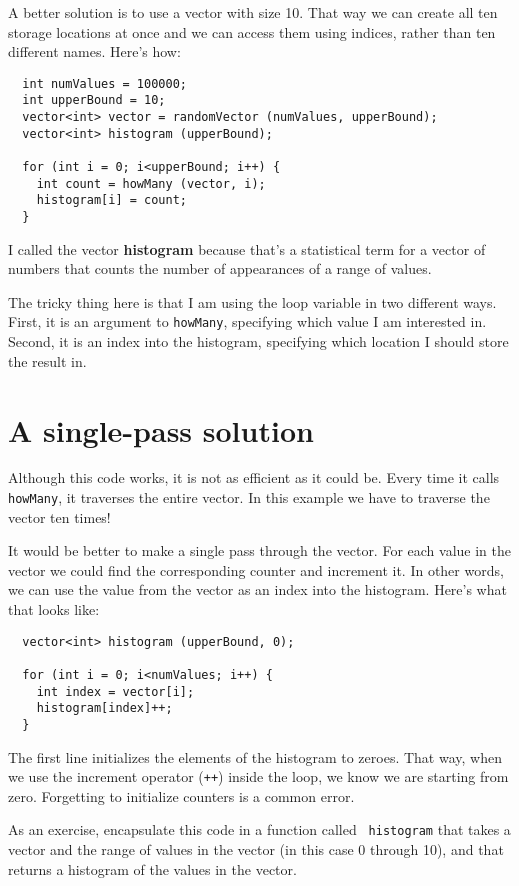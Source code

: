 A better solution is to use a vector with size 10.  That
way we can create all ten storage locations at once and we
can access them using indices, rather than ten different names.
Here's how:

\begin{lstlisting}
  int numValues = 100000;
  int upperBound = 10;
  vector<int> vector = randomVector (numValues, upperBound);
  vector<int> histogram (upperBound);

  for (int i = 0; i<upperBound; i++) {
    int count = howMany (vector, i);
    histogram[i] = count;
  }
\end{lstlisting}
%
I called the vector {\bf histogram} because that's
a statistical term for a vector of numbers that counts the
number of appearances of a range of values.


The tricky thing here is that I am using the loop variable
in two different ways.  First, it is an argument to {\tt howMany},
specifying which value I am interested in.  Second, it is
an index into the histogram, specifying which location I should
store the result in.

\section{A single-pass solution}

Although this code works, it is not as efficient as it could
be.  Every time it calls {\tt howMany}, it traverses the
entire vector.  In this example we have to traverse the
vector ten times!

It would be better to make a single pass through the vector.
For each value in the vector we could find the corresponding
counter and increment it.  In other words, we can use the
value from the vector as an index into the histogram.  Here's
what that looks like:

\begin{lstlisting}
  vector<int> histogram (upperBound, 0);

  for (int i = 0; i<numValues; i++) {
    int index = vector[i];
    histogram[index]++;
  }
\end{lstlisting}
%
The first line initializes the elements of the histogram to
zeroes.  That way, when we use the increment
operator ({\tt ++}) inside the loop, we know we are starting from zero.
Forgetting to initialize counters is a common error.

As an exercise, encapsulate this code in a function called {\tt
histogram} that takes a vector and the range of values in the vector
(in this case 0 through 10), and that returns a histogram of the
values in the vector.

